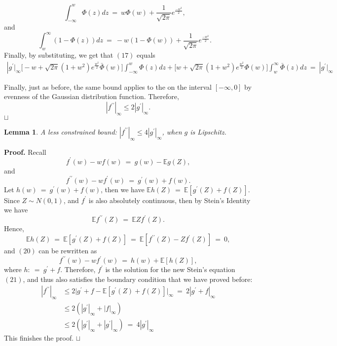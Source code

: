 \documentclass[12pt]{article}
\newcommand\qed{\hfill\hbox{\rlap{$\sqcap$}$\sqcup$}}
\newcommand{\eq }{\: = \:}
\newtheorem{lemma}{Lemma}
\theoremstyle{nonumberplain}
\begin{document}
\begin{equation}
\int_{-\infty}^{w}\Phi(z)dz \eq  w\Phi(w)+\frac{1}{\sqrt{2\pi}}e^{\frac{-w^{2}}{2}}, \quad
\end{equation}
and 
\begin{equation}
\int_{w}^{\infty}(1-\Phi(z))dz \eq  -w(1-\Phi(w))+\frac{1}{\sqrt{2\pi}}e^{\frac{-w^{2}}{2}}. \quad
\end{equation}
Finally, by substituting, we get that $(17)$ equals
\begin{align*}
|g^{\prime}\bigr|_{\infty} \bigl[-w+\sqrt{2\pi}(1+w^{2})e^{\frac{w^2}{2}} \bar{\Phi}(w)\bigr]\int_{-\infty}^{w}\Phi(z)dz + \bigl[w+ \sqrt{2\pi}(1+w^{2})e^{\frac{w^2}{2}}\Phi(w)\bigr] \int_{w}^{\infty} \bar{\Phi}(z)dz\eq |g^{\prime}\bigr|_{\infty}
\end{align*}

Finally, just as before, the same bound applies to the on the interval $[- \infty, 0]$ by evenness of the Gaussian distribution function. Therefore,
$$
|f^{\prime \prime}|_{\infty} \leq 2|g^{\prime}|_{\infty}.
$$
\qed

\begin{lemma}
A less constrained bound: $|f^{\prime \prime}|_{\infty} \leq 4|g^{\prime}|_{\infty}$, when $g$ is {\it Lipschitz\/}.
\end{lemma}
\textbf{Proof.} Recall 
$$
f^{\prime}(w)-wf(w)\eq g(w)-\mathbb{E}g(Z),
$$
and
\begin{equation}
f^{\prime \prime}(w)-wf^{\prime}(w)\eq g^{\prime}(w) + f(w).
\end{equation}
Let $h(w)\eq g^{\prime}(w)+f(w)$, then we have $\mathbb{E}h(Z)\eq \mathbb{E}[g^{\prime}(Z)+f(Z)]$. Since $Z\sim N(0,1)$, and $f^{\prime}$ is also absolutely continuous, then by Stein's Identity we have
$$
\mathbb{E}f^{\prime \prime}(Z)\eq \mathbb{E}Zf^{\prime}(Z).
$$
Hence,
$$
\mathbb{E}h(Z)\eq \mathbb{E}[g^{\prime}(Z)+f(Z)]\eq \mathbb{E}[f^{\prime \prime}(Z)-Zf^{\prime}(Z)] \eq 0,
$$
and $(20)$ can be rewritten as 
\begin{equation}
f^{\prime \prime}(w)-wf^{\prime}(w)\eq h(w)+\mathbb{E}[h(Z)],
\end{equation}
where $h:\eq  g^{\prime}+f$.
Therefore, $f^{\prime}$ is the solution for the new Stein’s equation $(21)$, and thus also satisfies the boundary condition that we have proved before:
\begin{align*}
|f^{\prime \prime}|_{\infty} &\leq 2\bigl|g^{\prime}+f-\mathbb{E}[g^{\prime}(Z)+f(Z)]\bigr|_{\infty}\eq 2|g^{\prime}+f|_{\infty}\\
&\leq 2(|g^{\prime}|_{\infty}+|f|_{\infty})\\
&\leq 2(|g^{\prime}|_{\infty}+|g^{\prime}|_{\infty})\eq 4|g^{\prime}|_{\infty}
\end{align*}
This finishes the proof.
\qed
\end{document}

